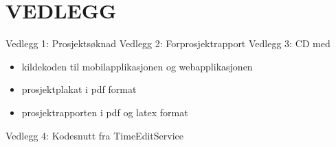 \documentclass[../main.tex]{subfiles}
\begin{document}
\appendix

\chapter{VEDLEGG}

Vedlegg 1: Prosjektsøknad\newline
\newline
Vedlegg 2: Forprosjektrapport\newline
\newline
Vedlegg 3: CD med 
\begin{itemize}
\item kildekoden til mobilapplikasjonen og webapplikasjonen
\item prosjektplakat i pdf format
\item prosjektrapporten i pdf og latex format
\end{itemize}
Vedlegg 4: Kodesnutt fra TimeEditService
\end{document}

